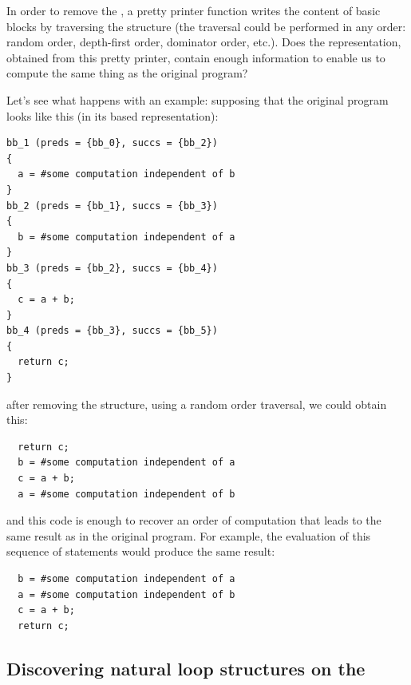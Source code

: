 In order to remove the \CFG{}, a pretty printer function writes the
content of basic blocks by traversing the \CFG{} structure (the \CFG{}
traversal could be performed in any order: random order, depth-first
order, dominator order, etc.).  Does the representation, obtained from
this pretty printer, contain enough information to enable us to
compute the same thing as the original program?

Let's see what happens with an example: supposing that the original
program looks like this (in its \CFG{} based \SSA{} representation):
\begin{verbatim}
bb_1 (preds = {bb_0}, succs = {bb_2})
{
  a = #some computation independent of b
}
bb_2 (preds = {bb_1}, succs = {bb_3})
{
  b = #some computation independent of a
}
bb_3 (preds = {bb_2}, succs = {bb_4})
{
  c = a + b;
}
bb_4 (preds = {bb_3}, succs = {bb_5})
{
  return c;
}
\end{verbatim}
after removing the \CFG{} structure, using a random order traversal,
we could obtain this:
\begin{verbatim}
  return c;
  b = #some computation independent of a
  c = a + b;
  a = #some computation independent of b
\end{verbatim}
and this \SSA{} code is enough to recover an order of computation that
leads to the same result as in the original program.  For example, the
evaluation of this sequence of statements would produce the same
result:
\begin{verbatim}
  b = #some computation independent of a
  a = #some computation independent of b
  c = a + b;
  return c;
\end{verbatim}

\subsection{Discovering natural loop structures on the \SSA{}}

